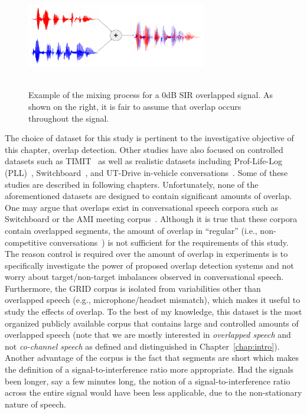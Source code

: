 \vspace{0mm}
\begin{figure}[h!]
	\centering
	\includegraphics[height =1.8in, width=0.7\textwidth]{figures/GRID_example_overlap-crop}
	\vspace{-2mm}
	\caption{ 
		Example of the mixing process for a 0dB SIR overlapped signal. As shown on the right, it is fair to assume that overlap occurs throughout the signal.}
	\label{fig:ch2_overlap_example}
\end{figure}

The choice of dataset for this study is pertinent to the investigative objective of this chapter, overlap detection. 
Other studies have also focused on controlled datasets such as TIMIT~\cite{nav_icassp13} as well as realistic datasets including Prof-Life-Log (PLL)~\cite{ziaei2013prof,nav_icassp15}, Switchboard~\cite{shokouhi2015probabilistic}, and UT-Drive in-vehicle conversations~\cite{sathyanarayana2013belt}. 
Some of these studies are described in following chapters. 
Unfortunately, none of the aforementioned datasets are designed to contain significant amounts of overlap. 
One may argue that overlaps exist in conversational speech corpora such as Switchboard or the AMI meeting corpus~\cite{amicorpus}. 
Although it is true that these corpora contain overlapped segments, the amount of overlap in ``regular'' (i.e., non-competitive conversations~\cite{schegloff2000overlapping}) is not sufficient for the requirements of this study. 
The reason control is required over the amount of overlap in experiments is to specifically investigate the power of proposed overlap detection systems and not worry about target/non-target imbalances observed in conversational speech. 
Furthermore, the GRID corpus is isolated from variabilities other than overlapped speech (e.g., microphone/headset mismatch), which makes it useful to study the effects of overlap. 
To the best of my knowledge, this dataset is the most organized publicly available corpus that contains large and controlled amounts of overlapped speech (note that we are mostly interested in {\it overlapped speech} and not {\it co-channel speech} as defined and distinguished in Chapter~\ref{chap:intro}). 
Another advantage of the corpus is the fact that segments are short which makes the definition of a signal-to-interference ratio more appropriate. Had the signals been longer, say a few minutes long, the notion of a signal-to-interference ratio across the entire signal would have been less applicable, due to the non-stationary nature of speech. 

